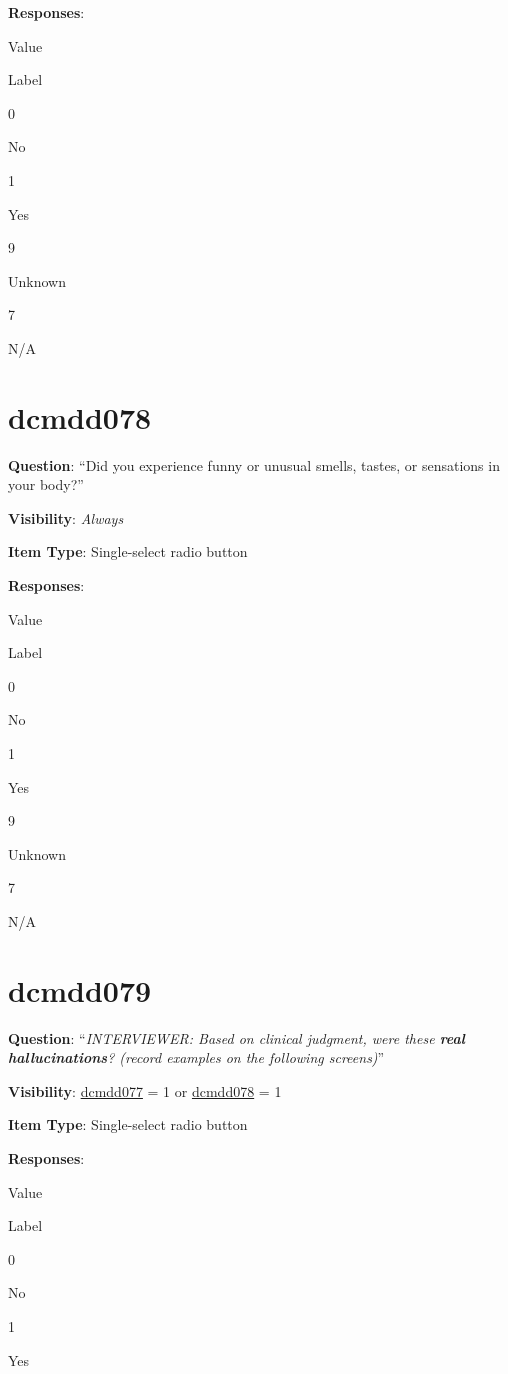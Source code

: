 \documentclass[
]{book}
\begin{document}
\textbf{Responses}:

Value

Label

0

No

1

Yes

9

Unknown

7

N/A

\hypertarget{dcmdd078}{%
\section{dcmdd078}\label{dcmdd078}}

\textbf{Question}: ``Did you experience funny or unusual smells, tastes, or sensations in your body?''

\textbf{Visibility}: \emph{Always}

\textbf{Item Type}: Single-select radio button

\textbf{Responses}:

Value

Label

0

No

1

Yes

9

Unknown

7

N/A

\hypertarget{dcmdd079}{%
\section{dcmdd079}\label{dcmdd079}}

\textbf{Question}: ``\emph{INTERVIEWER: Based on clinical judgment, were these \textbf{real hallucinations}? (record examples on the following screens)}''

\textbf{Visibility}: \protect\hyperlink{dcmdd077}{dcmdd077} = 1 or \protect\hyperlink{dcmdd078}{dcmdd078} = 1

\textbf{Item Type}: Single-select radio button

\textbf{Responses}:

Value

Label

0

No

1

Yes
\end{document}
